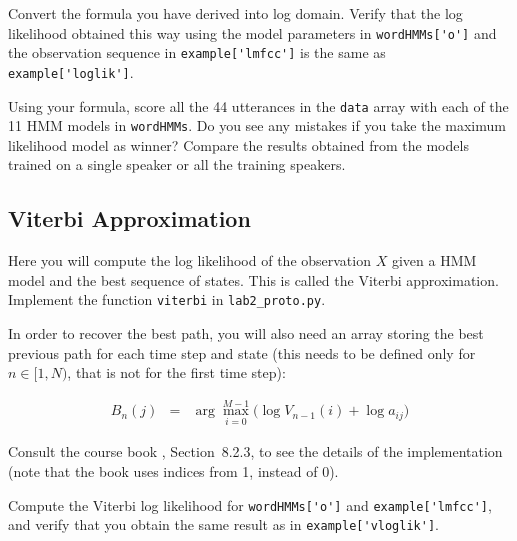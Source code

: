 \documentclass{nada-ten}
\begin{document}
Convert the formula you have derived into log domain.
Verify that the log likelihood obtained this way using the model parameters in \verb|wordHMMs['o']| and the observation sequence in \verb|example['lmfcc']| is the same as \verb|example['loglik']|.

Using your formula, score all the 44 utterances in the \texttt{data} array with each of the 11 HMM models in \texttt{wordHMMs}. Do you see any mistakes if you take the maximum likelihood model as winner? Compare the results obtained from the models trained on a single speaker or all the training speakers.



\subsection{Viterbi Approximation}
Here you will compute the log likelihood of the observation $X$ given a HMM model and the best sequence of states. This is called the Viterbi approximation. Implement the function \texttt{viterbi} in \texttt{lab2\_proto.py}. 

In order to recover the best path, you will also need an array storing the best previous path for each time step and state (this needs to be defined only for $n\in[1,N)$, that is not for the first time step):

\begin{eqnarray*}
  B_n(j) &=& \arg\max_{i=0}^{M-1} \Big(\log V_{n-1}(i) + \log a_{ij}\Big)
\end{eqnarray*}

Consult the course book \cite{gs:HuangEtAl2001Book}, Section~8.2.3, to see the details of the implementation (note that the book uses indices from 1, instead of 0).

Compute the Viterbi log likelihood for \verb|wordHMMs['o']| and \verb|example['lmfcc']|, and verify that you obtain the same result as in \verb|example['vloglik']|.
\end{document}
